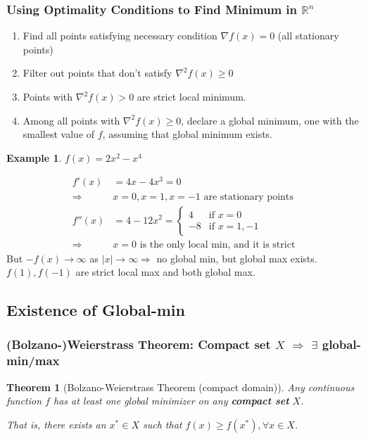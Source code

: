 \documentclass[11pt,a4paper]{article}
\newtheorem{theorem}{Theorem}
\newtheorem{example}{Example}
\begin{document}
\subsubsection{Using Optimality Conditions to Find Minimum in $\mathbb{R}^n$}
\begin{enumerate}
    \item Find all points satisfying necessary condition $\nabla f(x)=0$ (all stationary points)
    \item Filter out points that don't satisfy $\nabla^2 f(x)\geq 0$
    \item Points with $\nabla^2 f(x)> 0$ are strict local minimum.
    \item Among all points with $\nabla^2 f(x)\geq 0$, declare a global minimum, one with the smallest value of $f$, assuming that global minimum exists.
\end{enumerate}
\begin{example}
$f(x)=2x^2-x^4$
\end{example}
\begin{equation}
    \begin{aligned}
        f'(x)&=4x-4x^3=0\\
        \Rightarrow& x=0,x=1,x=-1\text{ are stationary points}\\
        f''(x)&=4-12x^2=\left\{\begin{matrix}
            4&\text{if }x=0\\
            -8&\text{if }x=1,-1
        \end{matrix}\right.\\
        \Rightarrow	&x=0\text{ is the only local min, and it is strict}
    \end{aligned}
    \nonumber
\end{equation}
But $-f(x) \rightarrow \infty$ as $|x|\rightarrow \infty \Rightarrow$ no global min, but global max exists. $f(1),f(-1)$ are strict local max and both global max.

\subsection{Existence of Global-min}
\subsubsection{(Bolzano-)Weierstrass Theorem: Compact set $X$ $\Rightarrow$ $\exists$ global-min/max}
\begin{theorem}[Bolzano-Weierstrass Theorem (compact domain)]
    Any continuous function $f$ has at least one global minimizer on any \textbf{compact set} $X$.

    That is, there exists an $x^{*} \in X$ such that $f(x) \geq f\left(x^{*}\right), \forall x \in X$.
\end{theorem}
\end{document}
